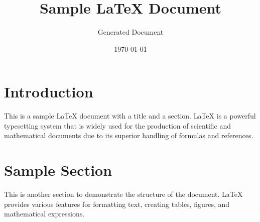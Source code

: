 \documentclass{article}
\title{Sample LaTeX Document}
\author{Generated Document}
\date{\today}
\begin{document}
\maketitle

\section{Introduction}
This is a sample LaTeX document with a title and a section. LaTeX is a powerful typesetting system that is widely used for the production of scientific and mathematical documents due to its superior handling of formulas and references.

\section{Sample Section}
This is another section to demonstrate the structure of the document. LaTeX provides various features for formatting text, creating tables, figures, and mathematical expressions.
\end{document}
